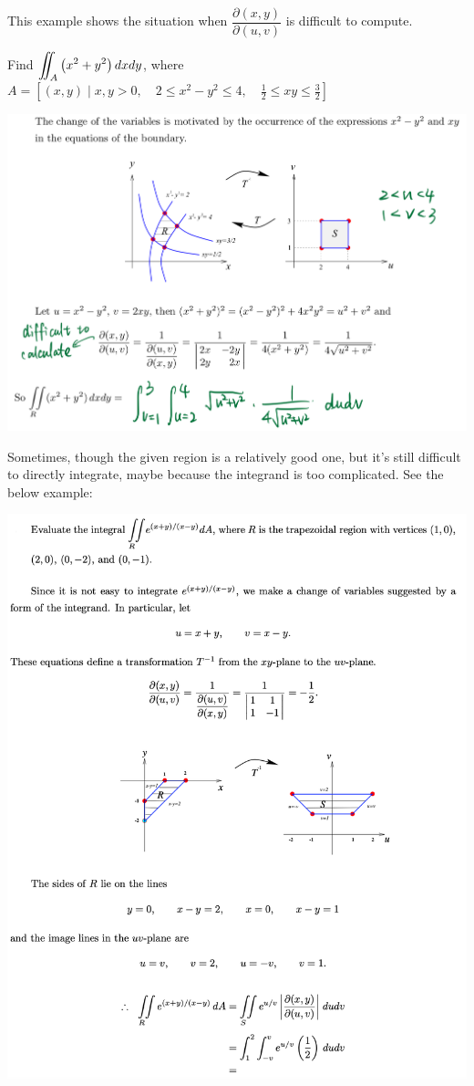 \begin{spacing}{1.3}
    \newpage
    {\blue This example shows the situation when $\dfrac{\partial(x, y)}{\partial(u, v)}$ is difficult to compute.}
    
    \eg Find $\displaystyle \iint_{A}\left(x^{2}+y^{2}\right) d x d y$, 
    where $A=\left[(x, y) \mid x, y>0, \quad 2 \leqslant x^{2}-y^{2} \leqslant 4, \quad \frac{1}{2} \leqslant x y \leqslant \frac{3}{2}\right]$

    \sol 
    
    \includegraphics[scale=0.25]{images/Ch14-jacobian-eg3.jpeg}


    \newpage
    Sometimes, though the given region is a relatively good one, but it's still difficult to directly
    integrate, maybe because the integrand is too complicated. See the below example:

    \eg 
    
    \includegraphics[scale=0.77]{images/Ch14-jacobian-eg4.png}



\end{spacing}
